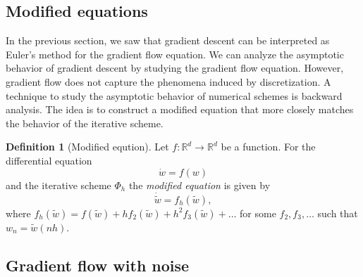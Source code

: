\documentclass[12pt]{article}
\theoremstyle{definition}
\newtheorem{definition}[definition]{Definition}
\numberwithin{equation}{section}
\newcommand{\R}{\mathbb{R}}
\begin{document}
\subsection{Modified equations}
\label{sec:modified_equations}
In the previous section, we saw that gradient descent can be interpreted as Euler's method for the gradient flow equation. We can analyze the asymptotic behavior of gradient descent by studying the gradient flow equation. However, gradient flow does not capture the phenomena induced by discretization. 
A technique to study the asymptotic behavior of numerical schemes is backward analysis. The idea is to construct a modified equation that more closely matches the behavior of the iterative scheme.
\begin{definition}[Modified eqution]
  Let $f: \R^d \rightarrow \R^d$ be a function. For the differential equation
  \begin{equation*}
    \dot{w} = f(w)
  \end{equation*}
  and the iterative scheme $\Phi_h$ the \emph{modified equation} is given by
  \begin{equation*}
    \dot{\tilde{w}} = f_h(\tilde{w}),
  \end{equation*}
  where $f_h(\tilde{w}) = f(\tilde{w}) + hf_2(\tilde{w}) + h^2f_3(\tilde{w})+\dots$
  for some $f_2, f_3, \dots$ such that $w_n = \tilde{w}(nh)$.
\end{definition}
\subsection{Gradient flow with noise}
\end{document}
